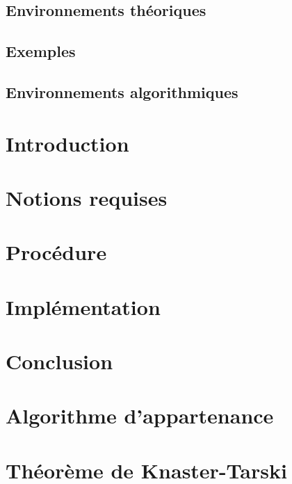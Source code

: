 

\newcommand{\student}{Benjamin André}
\newcommand{\grade}{MAB2 Sciences Informatiques}
\newcommand{\director}{Véronique Bruyère}
\renewcommand{\title}{Vérification de la sécurité d'automates à file par apprentissage actif}
\renewcommand{\date}{\today}



	

	\tableofcontents
	\newpage

	\section*{Environnements théoriques}

	\section*{Exemples}

	\section*{Environnements algorithmiques}

	\newpage


	\chapter{Introduction}\label{intro}
	\chapter{Notions requises}\label{pre}
	\chapter{Procédure}\label{pro}
	\chapter{Implémentation}\label{impl}%
	\chapter{Conclusion}\label{ccl}%

	\newpage
	
	

	\appendix
	\chapter{Algorithme d'appartenance}\label{app:membership}
	\chapter{Théorème de Knaster-Tarski}\label{app:tarski}


